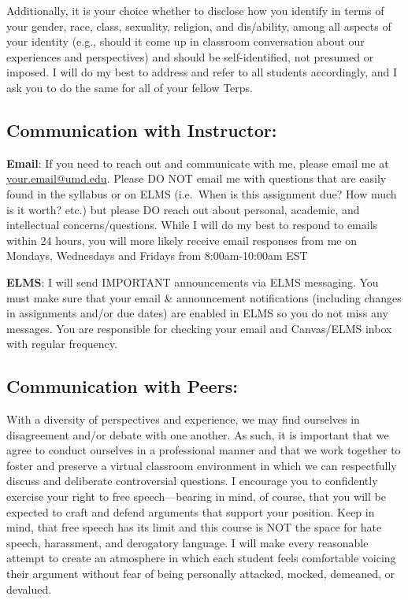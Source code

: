 \documentclass[11pt]{article}
\begin{document}
Additionally, it is your choice whether to disclose how you identify in
terms of your gender, race, class, sexuality, religion, and dis/ability,
among all aspects of your identity (e.g., should it come up in classroom
conversation about our experiences and perspectives) and should be
self-identified, not presumed or imposed. I will do my best to address
and refer to all students accordingly, and I ask you to do the same for
all of your fellow Terps.

\hypertarget{communication-with-instructor}{%
\subsection{Communication with
Instructor:}\label{communication-with-instructor}}

\textbf{Email}: If you need to reach out and communicate with me, please
email me at \url{your.email@umd.edu}. Please DO NOT email me with
questions that are easily found in the syllabus or on ELMS (i.e.~When is
this assignment due? How much is it worth? etc.) but please DO reach out
about personal, academic, and intellectual concerns/questions. While I
will do my best to respond to emails within 24 hours, you will more
likely receive email responses from me on Mondays, Wednesdays and
Fridays from 8:00am-10:00am EST

\textbf{ELMS}: I will send IMPORTANT announcements via ELMS messaging.
You must make sure that your email \& announcement notifications
(including changes in assignments and/or due dates) are enabled in ELMS
so you do not miss any messages. You are responsible for checking your
email and Canvas/ELMS inbox with regular frequency.

\hypertarget{communication-with-peers}{%
\subsection{Communication with Peers:}\label{communication-with-peers}}

With a diversity of perspectives and experience, we may find ourselves
in disagreement and/or debate with one another. As such, it is important
that we agree to conduct ourselves in a professional manner and that we
work together to foster and preserve a virtual classroom environment in
which we can respectfully discuss and deliberate controversial
questions. I encourage you to confidently exercise your right to free
speech---bearing in mind, of course, that you will be expected to craft
and defend arguments that support your position. Keep in mind, that free
speech has its limit and this course is NOT the space for hate speech,
harassment, and derogatory language. I will make every reasonable
attempt to create an atmosphere in which each student feels comfortable
voicing their argument without fear of being personally attacked,
mocked, demeaned, or devalued.
\end{document}
